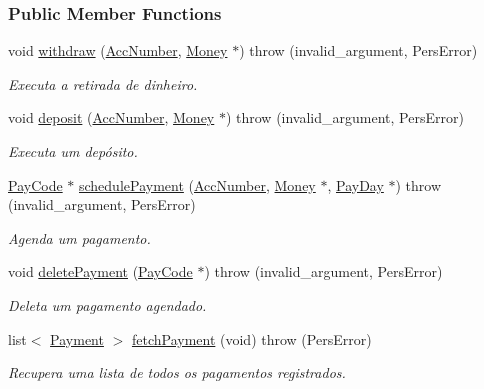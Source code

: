 \subsubsection*{Public Member Functions}
\begin{DoxyCompactItemize}
\item 
void \hyperlink{classCtrlTransacAdm_a694267772d5ea46f715b8c3586d9b5fa}{withdraw} (\hyperlink{classAccNumber}{Acc\-Number}, \hyperlink{classMoney}{Money} $\ast$)  throw (invalid\-\_\-argument, Pers\-Error)
\begin{DoxyCompactList}\small\item\em Executa a retirada de dinheiro. \end{DoxyCompactList}\item 
void \hyperlink{classCtrlTransacAdm_a1e4a7b8ca4c50eb9a31371a28ffa00ff}{deposit} (\hyperlink{classAccNumber}{Acc\-Number}, \hyperlink{classMoney}{Money} $\ast$)  throw (invalid\-\_\-argument, Pers\-Error)
\begin{DoxyCompactList}\small\item\em Executa um depósito. \end{DoxyCompactList}\item 
\hyperlink{classPayCode}{Pay\-Code} $\ast$ \hyperlink{classCtrlTransacAdm_a1c10db63c827ee8071d7dc839154382a}{schedule\-Payment} (\hyperlink{classAccNumber}{Acc\-Number}, \hyperlink{classMoney}{Money} $\ast$, \hyperlink{classPayDay}{Pay\-Day} $\ast$)  throw (invalid\-\_\-argument, Pers\-Error)
\begin{DoxyCompactList}\small\item\em Agenda um pagamento. \end{DoxyCompactList}\item 
void \hyperlink{classCtrlTransacAdm_a3c2d1900a471725e5e5122de9fa30a35}{delete\-Payment} (\hyperlink{classPayCode}{Pay\-Code} $\ast$)  throw (invalid\-\_\-argument, Pers\-Error)
\begin{DoxyCompactList}\small\item\em Deleta um pagamento agendado. \end{DoxyCompactList}\item 
list$<$ \hyperlink{classPayment}{Payment} $>$ \hyperlink{classCtrlTransacAdm_aa7e00879d0ad01b7cd6b3ad61d4d8c65}{fetch\-Payment} (void)  throw (\-Pers\-Error)
\begin{DoxyCompactList}\small\item\em Recupera uma lista de todos os pagamentos registrados. \end{DoxyCompactList}\end{DoxyCompactItemize}


